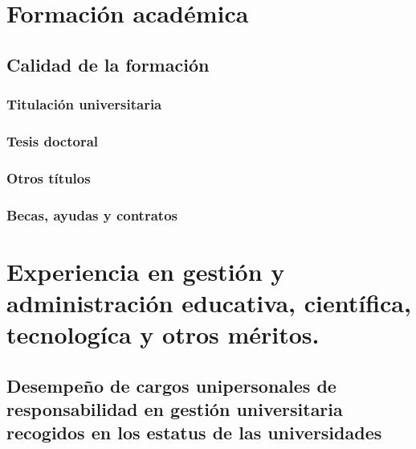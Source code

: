 \newpage\section{Formación académica}
\newpage\subsection{Calidad de la formación}
\newpage\subsubsection{Titulación universitaria}
\newpage\subsubsection{Tesis doctoral}
\newpage\subsubsection{Otros títulos}
\newpage\subsubsection{Becas, ayudas y contratos}
\newpage\section{Experiencia en gestión y administración educativa, científica, tecnologíca y otros méritos.}
\newpage\subsection{Desempeño de cargos unipersonales de responsabilidad en gestión universitaria recogidos en los estatus de las universidades}
\newpage